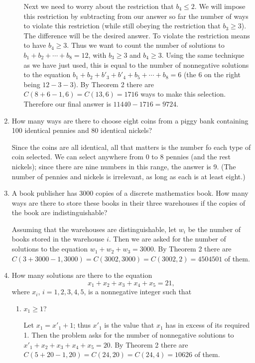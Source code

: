 \documentclass[11pt]{article}
\begin{document}
\begin{enumerate}[label=\textbf{\arabic*.}]
\begin{enumerate}[label=\textbf{\alph*)}]
		Next we need to worry about the restriction that $b_4 \leq 2$. We will impose this restriction by subtracting from our answer so far the number of ways to violate this restriction (while still obeying the restriction that $b_3 \geq 3$). The difference will be the desired answer. To violate the restriction means to have $b_4 \geq 3$. Thus we want to count the number of solutions to $b_1 + b_2 + \cdots + b_8 = 12$, with $b_3 \geq 3$ and $b_4 \geq 3$. Using the same technique as we have just used, this is equal to the number of nonnegative solutions to the equation $b_1 + b_2 + b'_3 +b'_4 + b_5 + \cdots + b_8 = 6$ (the 6 on the right being $12 - 3 - 3$). By Theorem 2 there are $C(8 + 6 - 1, 6) = C(13, 6) = 1716$ ways to make this selection. Therefore our final answer is $11440 - 1716 = 9724$.
	\end{enumerate}

	\item How many ways are there to choose eight coins from a piggy bank containing 100 identical pennies and 80 identical nickels?
	
	Since the coins are all identical, all that matters is the number fo each type of coin selected. We can select anywhere from 0 to 8 pennies (and the rest nickels); since there are nine numbers in this range, the answer is 9. (The number of pennies and nickels is irrelevant, as long as each is at least eight.)
	
	\item A book publisher has 3000 copies of a discrete mathematics book. How many ways are there to store these books in their three warehouses if the copies of the book are indistinguishable?
	
	Assuming that the warehouses are distinguishable, let $w_i$ be the number of books stored in the warehouse $i$. Then we are asked for the number of solutions to the equation $w_1 + w_2 + w_3 = 3000$. By Theorem 2 there are $C(3 + 3000 - 1, 3000) = C(3002, 3000) = C(3002, 2) = 4504501$ of them.
	
	\item How many solutions are there to the equation $$x_1 + x_2 + x_3 + x_4 + x_5 = 21,$$ where $x_i$, $i = 1, 2, 3, 4, 5$, is a nonnegative integer such that
	
	\begin{enumerate}[label=\textbf{\alph*)}]
		\item $x_1 \geq 1$?
		
		Let $x_1 = x'_1 + 1$; thus $x'_1$ is the value that $x_1$ has in excess of its required 1. Then the problem asks for the number of nonnegative solutions to $x'_1 + x_2 + x_3 + x_4 + x_5 = 20$. By Theorem 2 there are $C(5 + 20 - 1, 20) = C(24, 20) = C(24, 4) = 10626$ of them.
		

\end{enumerate}
\end{enumerate}
\end{document}
